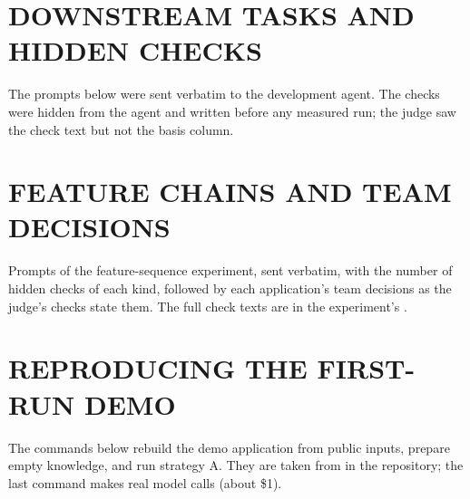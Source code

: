 \chapter{DOWNSTREAM TASKS AND HIDDEN CHECKS}
\label{app:tasks}

The prompts below were sent verbatim to the development agent. The checks were hidden from the agent and written before any measured run; the judge saw the check text but not the basis column.



\chapter{FEATURE CHAINS AND TEAM DECISIONS}
\label{app:loop}

Prompts of the feature-sequence experiment, sent verbatim, with the number of hidden checks of each kind, followed by each application's team decisions as the judge's checks state them. The full check texts are in the experiment's .

{\sloppy\par}

\chapter{REPRODUCING THE FIRST-RUN DEMO}
\label{app:demo}

The commands below rebuild the demo application from public inputs, prepare empty knowledge, and run strategy A. They are taken from  in the repository; the last command makes real model calls (about \$1).

